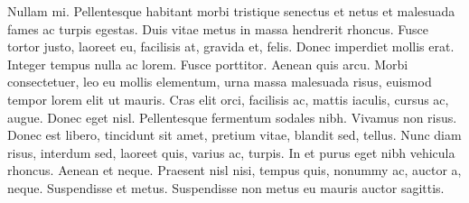 Nullam mi. Pellentesque habitant morbi tristique senectus et netus
et malesuada fames ac turpis egestas. Duis vitae metus in massa
hendrerit rhoncus. Fusce tortor justo, laoreet eu, facilisis at,
gravida et, felis. Donec imperdiet mollis erat. Integer tempus nulla
ac lorem. Fusce porttitor. Aenean quis arcu. Morbi consectetuer, leo
eu mollis elementum, urna massa malesuada risus, euismod tempor
lorem elit ut mauris. Cras elit orci, facilisis ac, mattis iaculis,
cursus ac, augue. Donec eget nisl. Pellentesque fermentum sodales
nibh. Vivamus non risus. Donec est libero, tincidunt sit amet,
pretium vitae, blandit sed, tellus. Nunc diam risus, interdum sed,
laoreet quis, varius ac, turpis. In et purus eget nibh vehicula
rhoncus. Aenean et neque. Praesent nisl nisi, tempus quis, nonummy
ac, auctor a, neque. Suspendisse et metus. Suspendisse non metus eu
mauris auctor sagittis.

